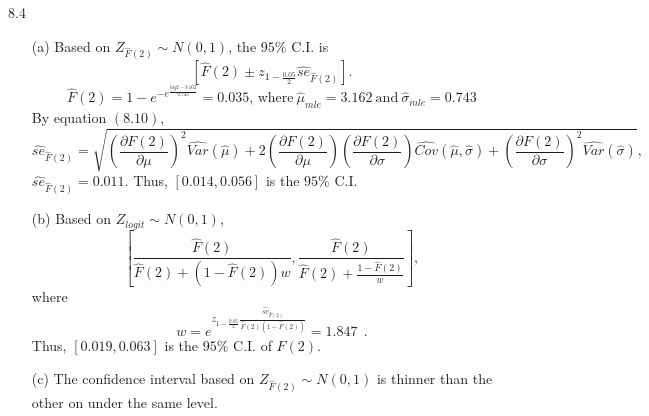 \documentclass[paper=a4, fontsize=12pt]{scrartcl} %
\numberwithin{equation}{section} %
\numberwithin{figure}{section} %
\numberwithin{table}{section} %
\begin{document}
\newpage
8.4 	
\begin{itemize}
	\item[(a)]	Based on $Z_{\widehat{F}(2)} \sim N(0, 1)$, the $95\%$ C.I. is  $$\left[\widehat{F}(2) \pm z_{1-\frac{0.05}{2}}\widehat{se}_{\widehat{F}(2)} \right].$$ $$\widehat{F}(2) = 1-e^{-e^{\frac{log2 - 3.162}{0.743}}} = 0.035 \text{, where} \ \widehat{\mu}_{mle} = 3.162\ \text{and}\ \widehat{\sigma}_{mle} = 0.743$$ By equation $(8.10)$, $$ \widehat{se}_{\widehat{F}(2)} = \sqrt{\left( \frac{\partial F(2)}{\partial \mu} \right)^2\widehat{Var}\left(\widehat{\mu}\right) + 2\left( \frac{\partial F(2)}{\partial \mu} \right)\left( \frac{\partial F(2)}{\partial \sigma} \right)\widehat{Cov}\left(\widehat{\mu}, \widehat{\sigma} \right) + \left( \frac{\partial F(2)}{\partial \sigma} \right)^2\widehat{Var}\left(\widehat{\sigma}\right)}, $$  $\widehat{se}_{\widehat{F}(2)} = 0.011$. Thus, $[0.014, 0.056]$ is the $95\%$ C.I.
	\item[(b)]	Based on $Z_{logit} \sim N(0, 1)$, $$\left[\frac{\widehat{F}(2)}{\widehat{F}(2) + \left(1-\widehat{F}(2) \right)w},  \frac{\widehat{F}(2)}{\widehat{F}(2) + \frac{1-\widehat{F}(2) }{w}}\right], $$ where $$w = e^{z_{1-\frac{0.05}{2}}\frac{\widehat{se}_{\widehat{F}(2)}}{\widehat{F}(2)\left( 1-\widehat{F}(2) \right)}} = 1.847\ \ . $$ Thus, $[0.019, 0.063]$ is  the $95\%$ C.I. of $F(2)$.  
	\item[(c)]	The confidence interval based on $Z_{\widehat{F}(2)} \sim N(0, 1)$ is thinner than the other on under the same level.
\end{itemize}
\end{document}
